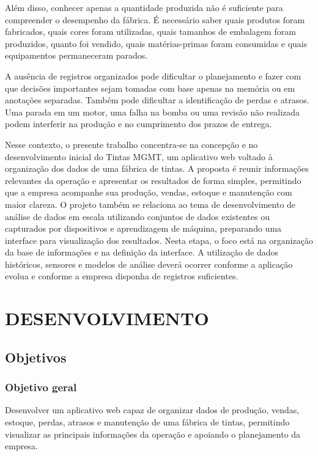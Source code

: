 \documentclass[12pt,a4paper]{article}
\begin{document}
Além disso, conhecer apenas a quantidade produzida não é suficiente para compreender o desempenho da fábrica. É necessário saber quais produtos foram fabricados, quais cores foram utilizadas, quais tamanhos de embalagem foram produzidos, quanto foi vendido, quais matérias-primas foram consumidas e quais equipamentos permaneceram parados.

A ausência de registros organizados pode dificultar o planejamento e fazer com que decisões importantes sejam tomadas com base apenas na memória ou em anotações separadas. Também pode dificultar a identificação de perdas e atrasos. Uma parada em um motor, uma falha na bomba ou uma revisão não realizada podem interferir na produção e no cumprimento dos prazos de entrega.

Nesse contexto, o presente trabalho concentra-se na concepção e no desenvolvimento inicial do Tintas MGMT, um aplicativo web voltado à organização dos dados de uma fábrica de tintas. A proposta é reunir informações relevantes da operação e apresentar os resultados de forma simples, permitindo que a empresa acompanhe sua produção, vendas, estoque e manutenção com maior clareza.
O projeto também se relaciona ao tema de desenvolvimento de análise de dados em escala utilizando conjuntos de dados existentes ou capturados por dispositivos e aprendizagem de máquina, preparando uma interface para visualização dos resultados. Nesta etapa, o foco está na organização da base de informações e na definição da interface. A utilização de dados históricos, sensores e modelos de análise deverá ocorrer conforme a aplicação evolua e conforme a empresa disponha de registros suficientes.

\clearpage
\section{DESENVOLVIMENTO}

\subsection{Objetivos}
\subsubsection*{Objetivo geral}
Desenvolver um aplicativo web capaz de organizar dados de produção, vendas, estoque, perdas, atrasos e manutenção de uma fábrica de tintas, permitindo visualizar as principais informações da operação e apoiando o planejamento da empresa.
\end{document}
